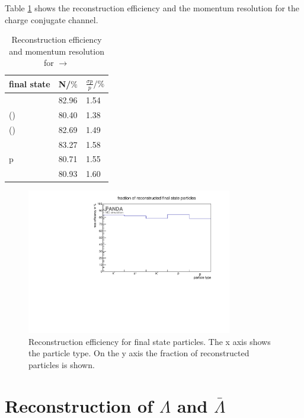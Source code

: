	Table \ref{tab:finalstate_recoeff_cc} shows the reconstruction efficiency and the momentum resolution for the charge conjugate channel.
	
	\begin{table}
		\centering
		\caption{\propose Reconstruction efficiency and momentum resolution for \pbarpSystem $\rightarrow$ \excitedanticascade \cascade}
		\label{tab:finalstate_recoeff_cc}
		\begin{tabular}{lll}
			\hline
			final state & N/$\%$ & $\frac{\sigma p}{p}/\%$ \\
			\hline
			\hline
			\piplus &  82.96&   1.54\\
			\piminusone(\cascade) & 80.40&   1.38  \\
			\piminustwo(\lam) &  82.69&   1.49\\
			\kplus& 83.27&   1.58 \\
			p &  80.71&   1.55\\
			\antiproton &  80.93&   1.60\\\hline
			 
		\end{tabular}
	\end{table}
	
	\begin{figure}
	
		\centering
		\includegraphics[width=0.8\textwidth]{./plots/finalstate/reco_efficiency.pdf}
		\caption{\propose Reconstruction efficiency for final state particles. The x axis shows the particle type. 
				On the y axis the fraction of reconstructed particles is shown.}
		\label{fig:finalstate_recoeff}
	
	\end{figure}
	

	
\section{Reconstruction of $\Lambda$ and $\bar{\Lambda}$}
